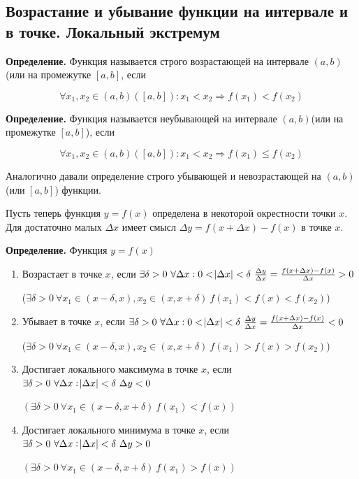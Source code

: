 \documentclass{article}
\begin{document}
\subsection{Возрастание и убывание функции на интервале и в точке. Локальный экстремум}

\textbf{Определение.} Функция называется строго возрастающей на интервале \((a, b)\)(или на промежутке \([a, b]\), если

\[\forall x_1, x_2 \in (a,b)([a,b]): x_1 < x_2 \Rightarrow f(x_1) < f(x_2)\]

\textbf{Определение.} Функция называется неубывающей на интервале \((a, b)\)(или на промежутке \([a, b]\)), если

\[\forall x_1, x_2 \in (a, b)([a, b]): x_1 < x_2 \Rightarrow f(x_1) \leq f(x_2)\]

Аналогично давали определение строго убывающей и невозрастающей на \((a, b)\)(или \([a,b]\)) функции.

Пусть теперь функция \(y = f(x)\) определена в некоторой окрестности точки \(x\). Для достаточно малых \(\Delta x\) имеет смысл \(\Delta y = f(x+\Delta x) - f(x)\) в точке \(x\).

\textbf{Определение.} Функция \(y = f(x)\)

\begin{enumerate}
    \item Возрастает в точке \(x\), если \(\exists \delta > 0\ \forall \Delta x: 0 < \abs{\Delta x} < \delta\ \frac{\Delta y}{\Delta x} = \frac{f(x+\Delta x)-f(x)}{\Delta x} > 0\)
    
    (\(\exists \delta > 0\ \forall x_1 \in (x-\delta, x), x_2 \in (x, x + \delta)\ f(x_1) < f(x) < f(x_2)\))
    \item Убывает в точке \(x\), если \(\exists \delta > 0\ \forall \Delta x: 0 < \abs{\Delta x} < \delta\ \frac{\Delta y}{\Delta x} = \frac{f(x+\Delta x)-f(x)}{\Delta x} < 0\)
    
    (\(\exists \delta > 0\ \forall x_1 \in (x-\delta, x), x_2 \in (x, x + \delta)\ f(x_1) > f(x) > f(x_2)\))
    \item Достигает локального максимума в точке \(x\), если \(\exists \delta > 0\ \forall \Delta x: \abs{\Delta x} < \delta\ \Delta y < 0\) 
    
    \((\exists \delta > 0\ \forall x_1 \in (x - \delta, x + \delta)\ f(x_1) < f(x))\)
    \item Достигает локального минимума в точке \(x\), если \(\exists \delta > 0\ \forall \Delta x: \abs{\Delta x} < \delta\ \Delta y > 0\) 
    
    \((\exists \delta > 0\ \forall x_1 \in (x - \delta, x + \delta)\ f(x_1) > f(x))\)
\end{enumerate}
\end{document}
